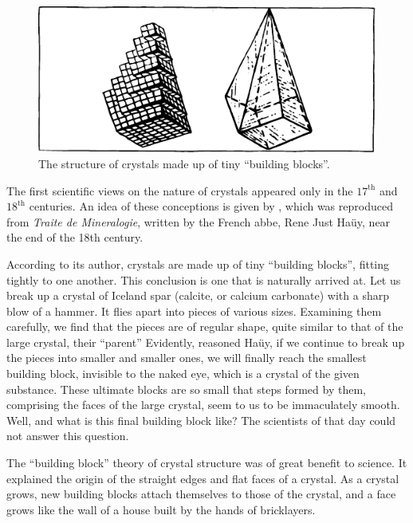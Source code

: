 \begin{figure}[!ht]
\centering
\includegraphics[width=\textwidth]{figures/fig-02-09.pdf}
\caption{The structure of crystals made up of tiny ``building blocks''.}
\label{fig-2.9}
\end{figure}



The first scientific views on the nature of crystals appeared only in the $17^{\textrm{th}}$ and $18^{\textrm{th}}$ centuries. An idea of these conceptions is given by , which was reproduced from \emph{Traite de Mineralogie}, written by the French abbe, Rene Just Ha\"uy, near the end of the 18th century. 

According to its author, crystals are made up of tiny ``building blocks'', fitting tightly to one another. This conclusion is one that is naturally arrived at. Let us break up a crystal of Iceland spar (calcite, or calcium carbonate) with a sharp blow of a hammer. It flies apart into pieces of various sizes. Examining them carefully, we find that the pieces are of regular shape, quite similar to that of the large crystal, their ``parent'' Evidently, reasoned Ha\"uy, if we continue to break up the pieces into smaller and smaller ones, we will finally reach the smallest building block, invisible to the naked eye, which is a crystal of the given substance. These ultimate blocks are so small that steps formed by them, comprising the faces of the large crystal, seem to us to be immaculately smooth. Well, and what is this final building block like? The scientists of that day could not answer this question.

The ``building block'' theory of crystal structure was of great benefit to science. It explained the origin of the straight edges and flat faces of a crystal. As a crystal grows, new building blocks attach themselves to those of the crystal, and a face grows like the wall of a house built by the hands of bricklayers.

